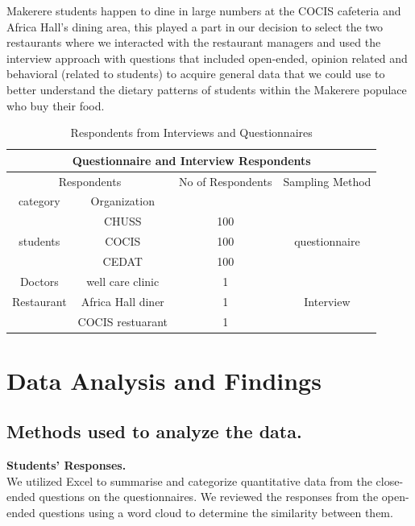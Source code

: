 \documentclass{article}
\begin{document}
\noindent Makerere students happen to dine in large numbers at the COCIS cafeteria and Africa Hall’s dining area, this played a part in our decision to select the two restaurants where we interacted with the restaurant managers and used the interview approach with questions that included open-ended, opinion related and behavioral (related to students) to acquire general data that we could use to better understand the dietary patterns of students within the Makerere populace who buy their food.
\vspace{40pt}
\begin{table}[h]
    \centering
    \caption{Respondents from Interviews and Questionnaires}
    
    \begin{tabular}{|c|c|c|c|}
    \hline
    \multicolumn{4}{|c|}{Questionnaire and Interview Respondents}\\
    \hline
    \multicolumn{2}{|c|}{Respondents} & No of Respondents & Sampling Method\\
    \cline{1-2}
    category & Organization &  & \\
    \hline
     & CHUSS & 100 &  \\
    \cline{2-3}
     students & COCIS & 100 & questionnaire \\
     \cline{2-3}
     & CEDAT & 100 & \\
     \hline
     Doctors & well care clinic & 1 &  \\
     \cline{1-3}
     Restaurant & Africa Hall diner & 1 & Interview \\
     \cline{2-3}
      & COCIS restuarant & 1 &  \\
     \hline          
    \end{tabular}
    
    \label{tab: Respondents from Interviews and Questionnaires}
\end{table}

\section{Data Analysis and Findings}
\subsection{Methods used to analyze the data.}
\textbf{Students' Responses.}\\
We utilized Excel to summarise and categorize quantitative data from the close-ended questions on the questionnaires. We reviewed the responses from the open-ended questions using a word cloud to determine the similarity between them.
\end{document}
